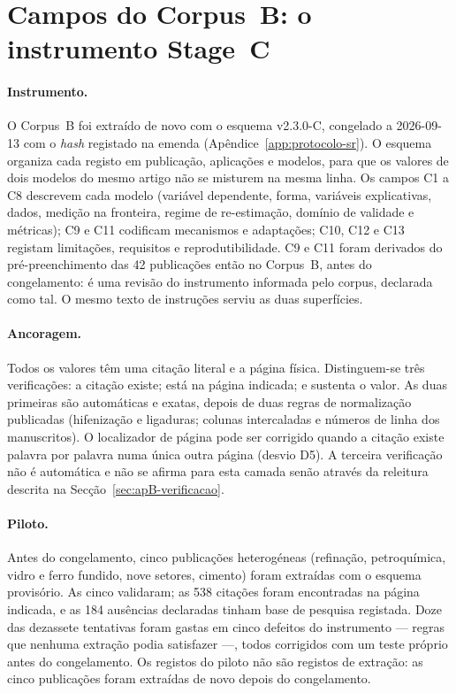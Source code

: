 \section{Campos do Corpus~B: o instrumento Stage~C}
\label{sec:apB-stage-c}

\paragraph{Instrumento.} O Corpus~B foi extraído de novo com o esquema
v2.3.0-C, congelado a 2026-09-13 com o \emph{hash} registado na emenda
(Apêndice~\ref{app:protocolo-sr}). O esquema organiza cada registo em
publicação, aplicações e modelos, para que os valores de dois modelos do
mesmo artigo não se misturem na mesma linha. Os campos C1 a C8 descrevem cada
modelo (variável dependente, forma, variáveis explicativas, dados, medição na
fronteira, regime de re-estimação, domínio de validade e métricas); C9 e C11
codificam mecanismos e adaptações; C10, C12 e C13 registam limitações,
requisitos e reprodutibilidade. C9 e C11 foram derivados do pré-preenchimento
das 42 publicações então no Corpus~B, antes do congelamento: é uma revisão do
instrumento informada pelo corpus, declarada como tal. O mesmo texto de
instruções serviu as duas superfícies.

\paragraph{Ancoragem.} Todos os valores têm uma citação literal e a página
física. Distinguem-se três verificações: a citação existe; está na página
indicada; e sustenta o valor. As duas primeiras são automáticas e exatas,
depois de duas regras de normalização publicadas (hifenização e ligaduras;
colunas intercaladas e números de linha dos manuscritos). O localizador de
página pode ser corrigido quando a citação existe palavra por palavra numa
única outra página (desvio D5). A terceira verificação não é automática e não
se afirma para esta camada senão através da releitura descrita na
Secção~\ref{sec:apB-verificacao}.

\paragraph{Piloto.} Antes do congelamento, cinco publicações heterogéneas
(refinação, petroquímica, vidro e ferro fundido, nove setores, cimento)
foram extraídas com o esquema provisório. As cinco validaram; as 538
citações foram encontradas na página indicada, e as 184 ausências declaradas
tinham base de pesquisa registada. Doze das dezassete tentativas foram gastas
em cinco defeitos do instrumento --- regras que nenhuma extração podia
satisfazer ---, todos corrigidos com um teste próprio antes do congelamento.
Os registos do piloto não são registos de extração: as cinco publicações
foram extraídas de novo depois do congelamento.

